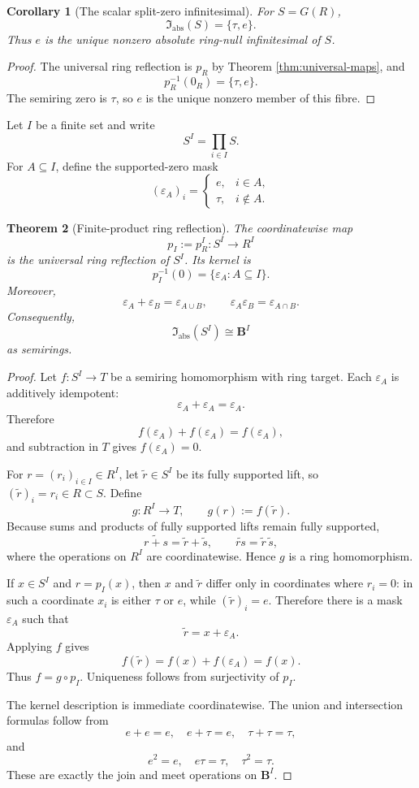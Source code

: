 \documentclass[11pt]{amsart}
\numberwithin{equation}{section}
\newtheorem{theorem}{Theorem}[section]
\newtheorem{corollary}[theorem]{Corollary}
\theoremstyle{definition}
\newcommand{\B}{\mathbf B}
\newcommand{\eps}{\varepsilon}
\begin{document}
\begin{corollary}[The scalar split-zero infinitesimal]\label{cor:scalar-absolute-halo}
For $S=G(R)$,
\[
\mathfrak I_{\mathrm{abs}}(S)=\{\tau,e\}.
\]
Thus $e$ is the unique nonzero absolute ring-null infinitesimal of $S$.
\end{corollary}

\begin{proof}
The universal ring reflection is $p_R$ by Theorem \ref{thm:universal-maps}, and
\[
p_R^{-1}(0_R)=\{\tau,e\}.
\]
The semiring zero is $\tau$, so $e$ is the unique nonzero member of this fibre.
\end{proof}

Let $I$ be a finite set and write
\[
S^I=\prod_{i\in I}S.
\]
For $A\subseteq I$, define the supported-zero mask
\[
(\eps_A)_i=
\begin{cases}
e,&i\in A,\\
\tau,&i\notin A.
\end{cases}
\]

\begin{theorem}[Finite-product ring reflection]\label{thm:product-ring-reflection}
The coordinatewise map
\[
p_I:=p_R^I:S^I\longrightarrow R^I
\]
is the universal ring reflection of $S^I$.  Its kernel is
\[
p_I^{-1}(0)=\{\eps_A:A\subseteq I\}.
\]
Moreover,
\[
\eps_A+\eps_B=\eps_{A\cup B},
\qquad
\eps_A\eps_B=\eps_{A\cap B}.
\]
Consequently,
\[
\mathfrak I_{\mathrm{abs}}(S^I)
\cong\B^I
\]
as semirings.
\end{theorem}

\begin{proof}
Let $f:S^I\to T$ be a semiring homomorphism with ring target.  Each $\eps_A$ is additively idempotent:
\[
\eps_A+\eps_A=\eps_A.
\]
Therefore
\[
f(\eps_A)+f(\eps_A)=f(\eps_A),
\]
and subtraction in $T$ gives $f(\eps_A)=0$.

For $r=(r_i)_{i\in I}\in R^I$, let $\widetilde r\in S^I$ be its fully supported lift, so $(\widetilde r)_i=r_i\in R\subset S$.  Define
\[
g:R^I\longrightarrow T,
\qquad
g(r):=f(\widetilde r).
\]
Because sums and products of fully supported lifts remain fully supported,
\[
\widetilde{r+s}=\widetilde r+\widetilde s,
\qquad
\widetilde{rs}=\widetilde r\,\widetilde s,
\]
where the operations on $R^I$ are coordinatewise.  Hence $g$ is a ring homomorphism.

If $x\in S^I$ and $r=p_I(x)$, then $x$ and $\widetilde r$ differ only in coordinates where $r_i=0$: in such a coordinate $x_i$ is either $\tau$ or $e$, while $(\widetilde r)_i=e$.  Therefore there is a mask $\eps_A$ such that
\[
\widetilde r=x+\eps_A.
\]
Applying $f$ gives
\[
f(\widetilde r)=f(x)+f(\eps_A)=f(x).
\]
Thus $f=g\circ p_I$.  Uniqueness follows from surjectivity of $p_I$.

The kernel description is immediate coordinatewise.  The union and intersection formulas follow from
\[
e+e=e,
\quad e+\tau=e,
\quad \tau+\tau=\tau,
\]
and
\[
e^2=e,
\quad e\tau=\tau,
\quad \tau^2=\tau.
\]
These are exactly the join and meet operations on $\B^I$.
\end{proof}
\end{document}
